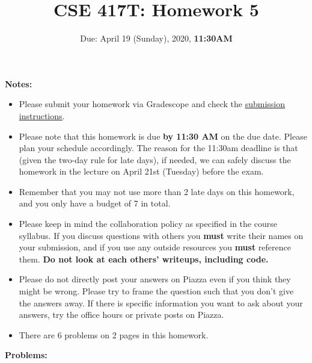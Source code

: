\documentclass[11pt]{article}
\begin{document}
\title{CSE 417T: Homework 5}
\date{Due: April 19 (Sunday), 2020, \textbf{11:30AM}}
\maketitle

\noindent \textbf{Notes: } 
\begin{itemize}

\item Please submit your homework via Gradescope and check the \href{http://chienjuho.com/courses/cse417t/hw_instructions.html}{\underline{submission instructions}}.

\item Please note that this homework is due \textbf{by 11:30 AM} on the due date. 
Please plan your schedule accordingly.
The reason for the 11:30am deadline is that (given the two-day rule for late days), if needed,
we can safely discuss the homework in the lecture on April 21st (Tuesday) before the exam.

\item  Remember that you may not use more than 2 late days on this homework, and you only have a budget of 7 in total.

\item Please keep in mind the collaboration policy as specified in the
  course syllabus. If you discuss questions with 
others you \textbf{must} write their names on your submission, and if
you use any outside resources you \textbf{must} reference
them. \textbf{Do not look at each others' writeups, including code.}
%
\item  Please do not directly post your answers on Piazza even if you think they might be wrong. Please try to frame the question such that you don’t give the answers away. If there is specific information you want to ask about your answers, try the office hours or private posts on Piazza.

\item There are 6 problems on 2 pages in this homework. 

\end{itemize}


\noindent \textbf{Problems:}
\end{document}

